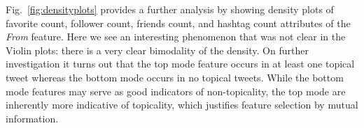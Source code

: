 Fig.~\ref{fig:densityplots} provides a further analysis by showing
density plots of favorite count, follower count, friends count, and
hashtag count attributes of the \textit{From} feature.  Here we see an
interesting phenomenon that was not clear in the Violin plots: there
is a very clear bimodality of the density.  On further investigation
it turns out that the top mode feature occurs in at least one topical
tweet whereas the bottom mode occurs in no topical tweets.  While the
bottom mode features may serve as good indicators of non-topicality,
the top mode are inherently more indicative of topicality, which
justifies feature selection by mutual information.

